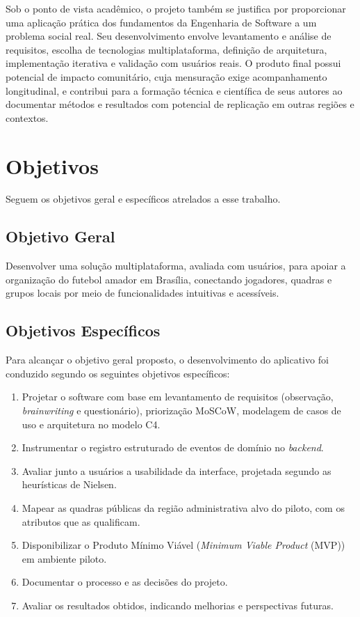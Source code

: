   Sob o ponto de vista acadêmico, o projeto também se justifica por proporcionar uma aplicação prática dos fundamentos da Engenharia de Software a um problema social real. Seu desenvolvimento envolve levantamento e análise de requisitos, escolha de tecnologias multiplataforma, definição de arquitetura, implementação iterativa e validação com usuários reais. O produto final possui potencial de impacto comunitário, cuja mensuração exige acompanhamento longitudinal, e contribui para a formação técnica e científica de seus autores ao documentar métodos e resultados com potencial de replicação em outras regiões e contextos.

\section{Objetivos}
  \label{sec:objetivos}

  Seguem os objetivos geral e específicos atrelados a esse trabalho.

  \subsection{Objetivo Geral}

    Desenvolver uma solução multiplataforma, avaliada com usuários, para apoiar a organização do futebol amador em Brasília, conectando jogadores, quadras e grupos locais por meio de funcionalidades intuitivas e acessíveis.

  \subsection{Objetivos Específicos}

    Para alcançar o objetivo geral proposto, o desenvolvimento do aplicativo foi conduzido segundo os seguintes objetivos específicos:

    \begin{enumerate}
      \item Projetar o software com base em levantamento de requisitos (observação, \textit{brainwriting} e questionário), priorização MoSCoW, modelagem de casos de uso e arquitetura no modelo C4.
      \item Instrumentar o registro estruturado de eventos de domínio no \textit{backend}.
      \item Avaliar junto a usuários a usabilidade da interface, projetada segundo as heurísticas de Nielsen.
      \item Mapear as quadras públicas da região administrativa alvo do piloto, com os atributos que as qualificam.
      \item Disponibilizar o Produto Mínimo Viável (\textit{Minimum Viable Product} (MVP)) em ambiente piloto.
      \item Documentar o processo e as decisões do projeto.
      \item Avaliar os resultados obtidos, indicando melhorias e perspectivas futuras.
    \end{enumerate}

